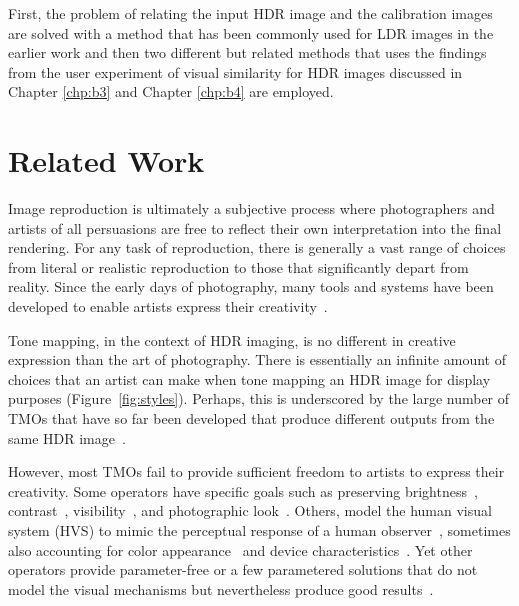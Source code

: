 First, the problem of relating the input HDR image and the calibration images are solved with a method that has been commonly used for LDR images in the earlier work and then two different but related methods that uses the findings from the user experiment of visual similarity for HDR images discussed in Chapter \ref{chp:b3} and Chapter \ref{chp:b4} are employed.


\section{Related Work}
Image reproduction is ultimately a subjective process where photographers and artists of all persuasions are free to reflect their own interpretation into the final rendering. For any task of reproduction, there is generally a vast range of choices from literal or realistic reproduction to those that significantly depart from reality. Since the early days of photography, many tools and systems have been developed to enable artists express their creativity~\cite{Adams80,Adams81,Adams83,White84}.

Tone mapping, in the context of HDR imaging, is no different in creative expression than the art of photography. There is essentially an infinite amount of choices that an artist can make when tone mapping an HDR image for display purposes (Figure~\ref{fig:styles}). Perhaps, this is underscored by the large number of TMOs that have so far been developed that produce different outputs from the same HDR image~\cite{Rein2010}.

However, most TMOs fail to provide sufficient freedom to artists to express their creativity. Some operators have specific goals such as preserving brightness~\cite{Tumb93}, contrast~\cite{Duan2004}, visibility~\cite{Ward97,yang2018adaptive}, and photographic look~\cite{Rein2002a}. Others, model the human visual system (HVS) to mimic the perceptual response of a human observer~\cite{Ferw96,Patt98,Meylan2006,khan2017tone}, sometimes also accounting for color appearance~\cite{Kuang2007,Reinhard2012} and device characteristics~\cite{Mantiuk2008}. Yet other operators provide parameter-free or a few parametered solutions that do not model the visual mechanisms but nevertheless produce good results~\cite{Dura02,Fatt02}.

